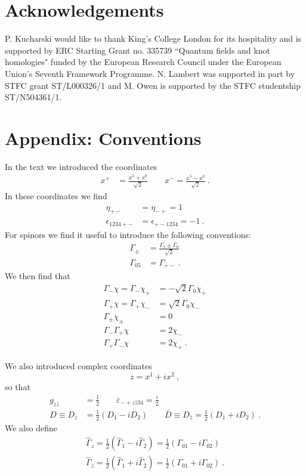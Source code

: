 \documentclass[12pt]{article}
\newcommand{\hG}{{\hat \Gamma}}
\newcommand{\nn}{\nonumber}
\numberwithin{equation}{section}
\begin{document}
\section*{Acknowledgements}
P. Kucharski would like to thank King's College London for its hospitality and is supported by ERC Starting Grant no. 335739 ``Quantum fields and knot homologies" funded by the European Research Council under the European Union's Seventh Framework Programme.   N. Lambert was supported in part by STFC grant ST/L000326/1 and M. Owen is supported by the STFC studentship ST/N504361/1.  

\section{Appendix: Conventions}

In the text we introduced the coordinates
\begin{align}
x^{+}&=\frac{x^{5}+ x^{0}}{\sqrt{2}}\qquad x^{-}=\frac{x^{5}- x^{0}}{\sqrt{2}}\ .
\end{align}
In these coordinates we find
\begin{align}
\eta_{+-}&=\eta_{-+}=1\nonumber \\
\epsilon_{1234+-}&=\epsilon_{+-1234}=-1\ .
\end{align}
For spinors we  find it useful to introduce the following conventions:
\begin{align}
\Gamma_{\pm} & = \frac{\Gamma_5 \pm \Gamma_0}{\sqrt{2}}\nn\\
\Gamma_{05} & = \Gamma_{+-}\ .
\end{align}
We then find that
\begin{align}
\Gamma_- \chi = \Gamma _- \chi_+ & = -\sqrt{2} \Gamma_0 \chi_+ \nonumber \\
\Gamma_+ \chi = \Gamma _+ \chi_- & = \sqrt{2} \Gamma_0 \chi_- \nonumber \\
\Gamma_{\pm}\chi_{\pm} & = 0\nn\\
\Gamma_-\Gamma_+\chi & = 2\chi_-\nn\\
\Gamma_+\Gamma_-\chi & = 2\chi_+\ .
\end{align}

We also introduced complex coordinates
\begin{equation}
z=x^{1}+ix^{2}\ ,
\end{equation}
so that 
\begin{align}
g_{z \bar{z}} &= \frac{1}{2} \qquad \varepsilon_{-+z\bar{z}34} = \frac{i}{2} \nn\\
 D \equiv D_z &= \frac{1}{2}\left( D_1 - i D_2 \right) \qquad \bar{D} \equiv D_{\bar{z}} = \frac{1}{2}\left( D_1 + i D_2 \right)   \ . 
\end{align}
We also define
\begin{eqnarray}
\hat\Gamma_{z} = \frac{1}{2} (\hat\Gamma_1 - i\hat\Gamma_2) =\frac{1}{2} ( \Gamma_{01} - i \Gamma_{02})  \nonumber \\
\hat\Gamma_{\bar{z}} = \frac{1}{2}(\hat\Gamma_1 + i\hat \Gamma_2)= \frac{1}{2} ( \Gamma_{01} + i \Gamma_{02})\ .
\end{eqnarray}
\end{document}
